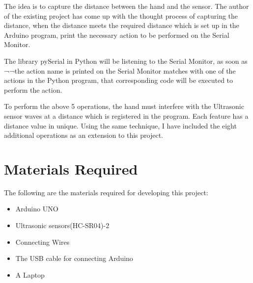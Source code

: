 \documentclass[12pt,journal]{IEEEtran}
\begin{document}
\par The idea is to capture the distance between the hand and the sensor. The author of the existing project has come up with the thought process of capturing the distance, when the distance meets the required distance which is set up in the Arduino program, print the necessary action to be performed on the Serial Monitor.
\par The library pySerial in Python will be listening to the Serial Monitor, as soon as ¬¬the action name is printed on the Serial Monitor matches with one of the actions in the Python program, that corresponding code will be executed to perform the action.
\newpage
\par To perform the above 5 operations, the hand must interfere with the Ultrasonic sensor waves at a distance which is registered in the program. Each feature has a distance value in unique. Using the same technique, I have included the eight additional operations as an extension to this project.
\section{Materials Required}
The following are the materials required for developing this project:
\begin{itemize}
  \item Arduino UNO
  \item Ultrasonic sensors(HC-SR04)-2
  \item Connecting Wires
  \item The USB cable for connecting Arduino
  \item A Laptop
\end{itemize}
\end{document}
